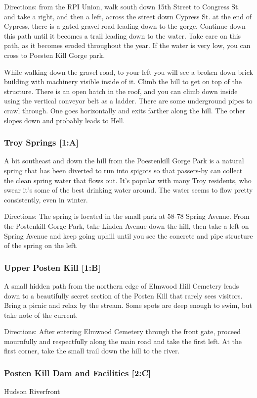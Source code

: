 \documentclass{article}
\begin{document}
Directions: from the RPI Union, walk south down 15th Street to Congress St. and take a right, and then a left, across the street down Cypress St. at the end of Cypress, there is a gated gravel road leading down to the gorge. Continue down this path until it becomes a trail leading down to the water. Take care on this path, as it becomes eroded throughout the year. 
If the water is very low, you can cross to Poesten Kill Gorge park.

While walking down the gravel road, to your left you will see a broken-down brick building with machinery visible inside of it. Climb the hill to get on top of the structure. There is an open hatch in the roof, and you can climb down inside using the vertical conveyor belt as a ladder. There are some underground pipes to crawl through. One goes horizontally and exits farther along the hill. The other slopes down and probably leads to Hell. 
\subsubsection{Troy Springs [1:A]}
A bit southeast and down the hill from the Poestenkill Gorge Park is a natural spring that has been diverted to run into spigots so that passers-by can collect the clean spring water that flows out. It’s popular with many Troy residents, who swear it’s some of the best drinking water around. The water seems to flow pretty consistently, even in winter. 

Directions: The spring is located in the small park at 58-78 Spring Avenue. From the Postenkill Gorge Park, take Linden Avenue down the hill, then take a left on Spring Avenue and keep going uphill until you see the concrete and pipe structure of the spring on the left.
\subsubsection{Upper Posten Kill [1:B]}
A small hidden path from the northern edge of Elmwood Hill Cemetery leads down to a beautifully secret section of the Posten Kill that rarely sees visitors. Bring a picnic and relax by the stream. Some spots are deep enough to swim, but take note of the current.

Directions: After entering Elmwood Cemetery through the front gate, proceed mournfully and respectfully along the main road and take the first left. At the first corner, take the small trail down the hill to the river.
\subsubsection{Posten Kill Dam and Facilities [2:C]}
Hudson Riverfront
\end{document}

